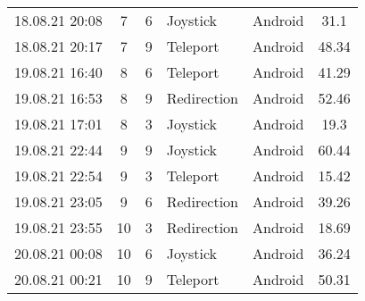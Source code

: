 \begin{landscape}
\begin{table}[]
\begin{tabular}{lccllc}
18.08.21 20:08 & 7  & 6     & Joystick    & Android     & 31.1           \\
18.08.21 20:17 & 7  & 9     & Teleport    & Android     & 48.34          \\
19.08.21 16:40 & 8  & 6     & Teleport    & Android     & 41.29          \\
19.08.21 16:53 & 8  & 9     & Redirection & Android     & 52.46          \\
19.08.21 17:01 & 8  & 3     & Joystick    & Android     & 19.3           \\
19.08.21 22:44 & 9  & 9     & Joystick    & Android     & 60.44          \\
19.08.21 22:54 & 9  & 3     & Teleport    & Android     & 15.42          \\
19.08.21 23:05 & 9  & 6     & Redirection & Android     & 39.26          \\
19.08.21 23:55 & 10 & 3     & Redirection & Android     & 18.69          \\
20.08.21 00:08 & 10 & 6     & Joystick    & Android     & 36.24          \\
20.08.21 00:21 & 10 & 9     & Teleport    & Android     & 50.31
\end{tabular}
\caption{}
\label{tab:my-table}
\end{table}
\end{landscape}